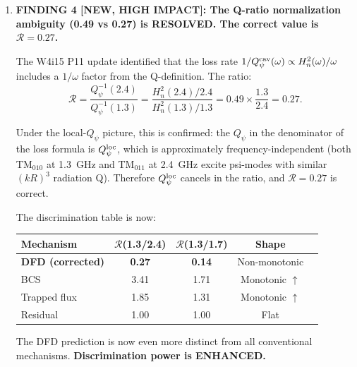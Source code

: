 \documentclass[11pt]{article}
\theoremstyle{definition}
\theoremstyle{remark}
\begin{document}
\begin{tcolorbox}[colback=blue!5!white, colframe=blue!60!black,
  title=\textbf{W4i16 TOP 5 FINDINGS --- Ranked by Programme Impact}]
\begin{enumerate}
\textbf{Net effect on MEMS}: The MEMS detection threshold
$Q_\psi^{\rm crit}$ was defined assuming the global mode. Under
the local-mode picture, the threshold concept is replaced by: the
local cavity psi-mode IS the signal source, and its Q is a fixed
property of the geometry (not a free parameter). The MEMS sensitivity
then depends only on $|\lambda-1|$, the cavity stored energy, and
the distance $d$. \textbf{The ``$Q_\psi$ threshold'' disappears
as a separate requirement.}

\item \textbf{FINDING 4 [NEW, HIGH IMPACT]: The Q-ratio normalization
ambiguity (0.49 vs 0.27) is RESOLVED. The correct value is
$\mathcal{R} = 0.27$.}

The W4i15 P11 update identified that the loss rate
$1/Q_\psi^{\rm cav}(\omega) \propto H_n^2(\omega)/\omega$ includes
a $1/\omega$ factor from the Q-definition. The ratio:
\begin{equation}
\mathcal{R} = \frac{Q_\psi^{-1}(2.4)}{Q_\psi^{-1}(1.3)}
= \frac{H_n^2(2.4)/2.4}{H_n^2(1.3)/1.3}
= 0.49 \times \frac{1.3}{2.4} = 0.27.
\end{equation}

Under the local-$Q_\psi$ picture, this is confirmed: the $Q_\psi$
in the denominator of the loss formula is $Q_\psi^{\rm loc}$, which
is approximately frequency-independent (both TM$_{010}$ at 1.3~GHz
and TM$_{011}$ at 2.4~GHz excite psi-modes with similar $(kR)^3$
radiation Q). Therefore $Q_\psi^{\rm loc}$ cancels in the ratio,
and $\mathcal{R} = 0.27$ is correct.

The discrimination table is now:

\begin{center}
\begin{tabular}{lcccc}
\toprule
Mechanism & $\mathcal{R}$(1.3/2.4) & $\mathcal{R}$(1.3/1.7) & Shape \\
\midrule
\textbf{DFD (corrected)} & \textbf{0.27} & \textbf{0.14} & Non-monotonic \\
BCS & 3.41 & 1.71 & Monotonic $\uparrow$ \\
Trapped flux & 1.85 & 1.31 & Monotonic $\uparrow$ \\
Residual & 1.00 & 1.00 & Flat \\
\bottomrule
\end{tabular}
\end{center}

The DFD prediction is now even more distinct from all conventional
mechanisms. \textbf{Discrimination power is ENHANCED.}


\end{enumerate}
\end{tcolorbox}
\end{document}
